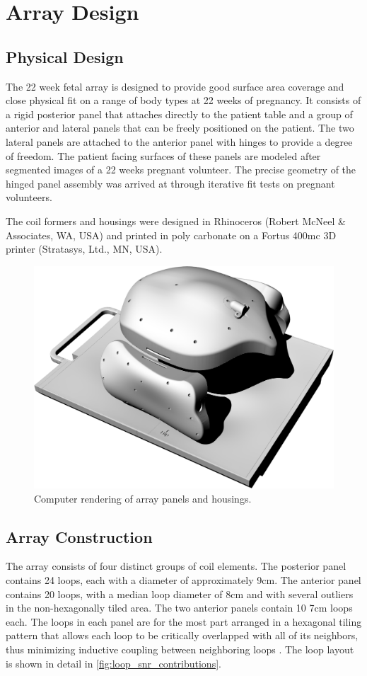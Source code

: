 \chapter{Array Design}
\section{Physical Design}
The 22 week fetal array is designed to provide good surface area coverage and close physical fit on a range of body
types at 22 weeks of pregnancy.  It consists of a rigid posterior panel that attaches directly to the patient table and
a group of anterior and lateral panels that can be freely positioned on the patient. The two lateral panels are attached
to the anterior panel with hinges to provide a degree of freedom. The patient facing surfaces of these panels are
modeled after segmented images of a 22 weeks pregnant volunteer. The precise geometry of the hinged panel assembly was
arrived at through iterative fit tests on pregnant volunteers.
 
The coil formers and housings were designed in Rhinoceros (Robert McNeel \& Associates, WA, USA) and printed in
poly carbonate on a Fortus 400mc 3D printer (Stratasys, Ltd., MN, USA).

\begin{figure}
\includegraphics[width=6in]{figures/cad_rendering.png}
\caption{Computer rendering of array panels and housings.}
\label{fig:cad_rendering}
\end{figure}

\section{Array Construction}
The array consists of four distinct groups of coil elements. The posterior panel contains 24 loops, each with a diameter
of approximately 9cm. The anterior panel contains 20 loops, with a median loop diameter of 8cm and with several outliers
in the non-hexagonally tiled area. The two anterior panels contain 10 7cm loops each. The loops in each panel are for
the most part arranged in a hexagonal tiling pattern that allows each loop to be critically overlapped with all of its
neighbors,  thus minimizing inductive coupling between neighboring loops \cite{Roemer94}. The loop layout is shown in
detail in \ref{fig:loop_snr_contributions}.

